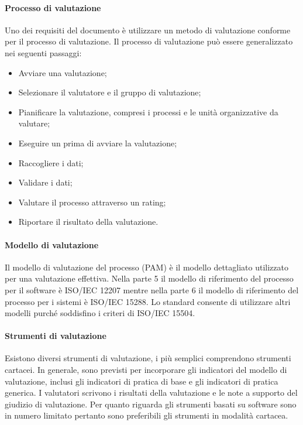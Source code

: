\documentclass[../piano-di-qualifica.tex]{subfiles}
\begin{document}
\paragraph{Processo di valutazione}
\label{sub:processo_di_valutazione}
Uno dei requisiti del documento è utilizzare un metodo di valutazione conforme per il processo di valutazione.
Il processo di valutazione può essere generalizzato nei seguenti passaggi:
\begin{itemize}
    \item Avviare una valutazione;
    \item Selezionare il valutatore e il gruppo di valutazione;
    \item Pianificare la valutazione, compresi i processi e le unità organizzative da valutare;
    \item Eseguire un  prima di avviare la valutazione;
    \item Raccogliere i dati;
    \item Validare i dati;
    \item Valutare il processo attraverso un rating;
    \item Riportare il risultato della valutazione.
\end{itemize}

\paragraph{Modello di valutazione}
\label{sub:modello_di_valutazione}
Il modello di valutazione del processo (PAM) è il modello dettagliato utilizzato per una valutazione effettiva.
Nella parte 5 il modello di riferimento del processo per il software è ISO/IEC 12207 mentre nella parte 6 il modello di riferimento del processo per i sistemi è ISO/IEC 15288.
Lo standard consente di utilizzare altri modelli purché soddisfino i criteri di ISO/IEC 15504.

\paragraph{Strumenti di valutazione}
\label{sub:strumenti_di_valutazione}
Esistono diversi strumenti di valutazione, i più semplici comprendono strumenti cartacei. In generale, sono previsti per incorporare gli indicatori del modello di valutazione, inclusi gli indicatori di pratica di base e gli indicatori di pratica generica. I valutatori scrivono i risultati della valutazione e le note a supporto del giudizio di valutazione.
Per quanto riguarda gli strumenti basati su software sono in numero limitato pertanto sono preferibili gli strumenti in modalità cartacea.
\end{document}
